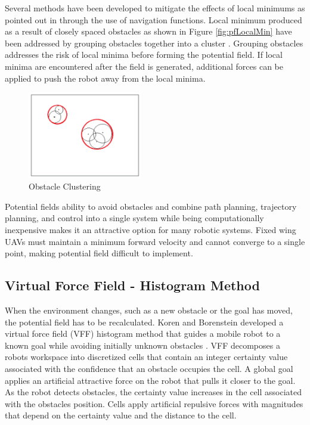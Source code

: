 \documentclass[numbered,pdftex]{ohio-etd}
\begin{document}
Several methods have been developed to mitigate the effects of local minimums as pointed out in \cite{goerzen_survey_2010} through the use of navigation functions. Local minimum produced as a result of closely spaced obstacles as shown in Figure \ref{fig:pfLocalMin} have been addressed by grouping obstacles together into a cluster \cite{liu_virtual-waypoint_2016}. Grouping obstacles addresses the risk of local minima before forming the potential field. If local minima are encountered after the field is generated, additional forces can be applied to push the robot away from the local minima. 

\begin{figure}[H]
	\centering
	\includegraphics[width=5cm]{PaperFigures/obstacleClustering}
	\caption{Obstacle Clustering \cite{liu_virtual-waypoint_2016}}
	\label{fig:obstacleclustering}
\end{figure}

Potential fields ability to avoid obstacles and combine path planning, trajectory planning, and control into a single system while being computationally inexpensive makes it an attractive option for many robotic systems. Fixed wing UAVs must maintain a minimum forward velocity and cannot converge to a single point, making potential field difficult to implement. 







\subsection{Virtual Force Field - Histogram Method}
When the environment changes, such as a new obstacle or the goal has moved, the potential field has to be recalculated. Koren and Borenstein developed a virtual force field (VFF) histogram method that guides a mobile robot to a known goal while avoiding initially unknown obstacles \cite{borenstein_real-time_1990}. VFF decomposes a robots workspace into discretized cells that contain an integer certainty value associated with the confidence that an obstacle occupies the cell. A global goal applies an artificial attractive force on the robot that pulls it closer to the goal. As the robot detects obstacles, the certainty value increases in the cell associated with the obstacles position. Cells apply artificial repulsive forces with magnitudes that depend on the certainty value and the distance to the cell. 
\end{document}
